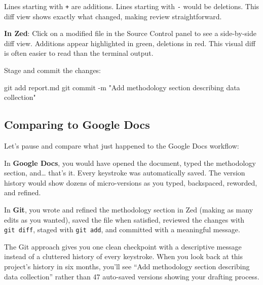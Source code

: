 \documentclass[
  letterpaper,
  DIV=11,
  numbers=noendperiod]{scrreprt}
\newenvironment{Shaded}{\begin{snugshade}}{\end{snugshade}}
\newcommand{\AttributeTok}[1]{\textcolor[rgb]{0.40,0.45,0.13}{#1}}
\newcommand{\FunctionTok}[1]{\textcolor[rgb]{0.28,0.35,0.67}{#1}}
\newcommand{\NormalTok}[1]{\textcolor[rgb]{0.00,0.23,0.31}{#1}}
\newcommand{\StringTok}[1]{\textcolor[rgb]{0.13,0.47,0.30}{#1}}
\begin{document}
Lines starting with \texttt{+} are additions. Lines starting with
\texttt{-} would be deletions. This diff view shows exactly what
changed, making review straightforward.

\textbf{In Zed}: Click on a modified file in the Source Control panel to
see a side-by-side diff view. Additions appear highlighted in green,
deletions in red. This visual diff is often easier to read than the
terminal output.

Stage and commit the changes:

\begin{codelisting}

\caption{\texttt{terminal}}

\begin{Shaded}
\begin{Highlighting}[]
\FunctionTok{git}\NormalTok{ add report.md}
\FunctionTok{git}\NormalTok{ commit }\AttributeTok{{-}m} \StringTok{"Add methodology section describing data collection"}
\end{Highlighting}
\end{Shaded}

\end{codelisting}

\subsection{Comparing to Google Docs}\label{comparing-to-google-docs}

Let's pause and compare what just happened to the Google Docs workflow:

In \textbf{Google Docs}, you would have opened the document, typed the
methodology section, and\ldots{} that's it. Every keystroke was
automatically saved. The version history would show dozens of
micro-versions as you typed, backspaced, reworded, and refined.

In \textbf{Git}, you wrote and refined the methodology section in Zed
(making as many edits as you wanted), saved the file when satisfied,
reviewed the changes with \texttt{git\ diff}, staged with
\texttt{git\ add}, and committed with a meaningful message.

The Git approach gives you one clean checkpoint with a descriptive
message instead of a cluttered history of every keystroke. When you look
back at this project's history in six months, you'll see ``Add
methodology section describing data collection'' rather than 47
auto-saved versions showing your drafting process.
\end{document}
